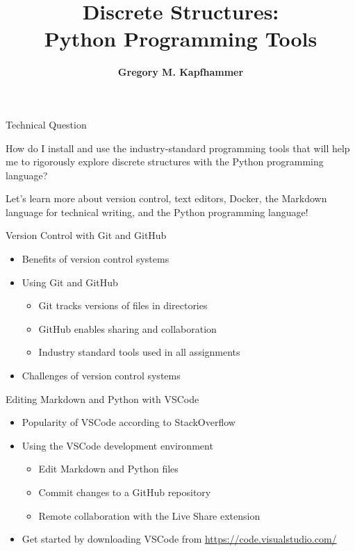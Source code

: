 \documentclass[14pt,aspectratio=169]{beamer}
\title{Discrete Structures: \\ Python Programming Tools}
\author{{\bf Gregory M. Kapfhammer}}
\institute[shortinst]{{\bf Department of Computer Science, Allegheny College}}
\begin{document}
{
  \begin{frame}
    \titlepage
  \end{frame}
}

%
\begin{frame}{Technical Question}
  \begin{center}
    {\large How do I install and use the industry-standard programming tools that will
      help me to rigorously explore discrete structures with the Python
    programming language?}
  \end{center}
  \vspace{2ex}
  \begin{center}
    \small Let's learn more about version control, text editors, Docker,
    the Markdown language for technical writing, and the Python programming
    language!
  \end{center}
\end{frame}

%
\begin{frame}{Version Control with Git and GitHub}
%
  \begin{itemize}
    \item Benefits of version control systems
    \item Using Git and GitHub
      \begin{itemize}
        \item Git tracks versions of files in directories
        \item GitHub enables sharing and collaboration
        \item Industry standard tools used in all assignments
      \end{itemize}
    \item Challenges of version control systems
  \end{itemize}
%
\end{frame}

%
\begin{frame}{Editing Markdown and Python with VSCode}
%
  \begin{itemize}
    \item Popularity of VSCode according to StackOverflow
    \item Using the VSCode development environment
      \begin{itemize}
        \item Edit Markdown and Python files
        \item Commit changes to a GitHub repository
        \item Remote collaboration with the Live Share extension
      \end{itemize}
    \item Get started by downloading VSCode from \url{https://code.visualstudio.com/}
  \end{itemize}
%
\end{frame}
\end{document}
